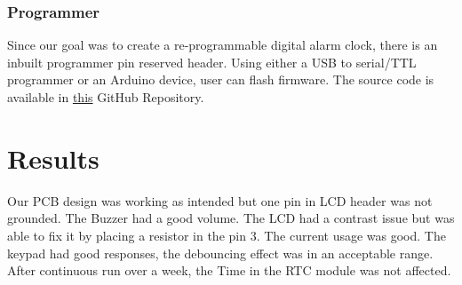 \subsection{Programmer}

Since our goal was to create a re-programmable digital alarm clock, there is an inbuilt programmer pin reserved header. Using either a USB to serial/TTL programmer or an Arduino device, user can flash firmware. The source code is available in \href{https://github.com/dakshinatharindu/Digital-Alarm-Clock}{this} GitHub Repository.

\chapter{Results}
Our PCB design was working as intended but one pin in LCD header was not grounded. The Buzzer had a good volume. The LCD had a contrast issue but was able to fix it by placing a resistor in the pin 3. The current usage was good. The keypad had good responses, the debouncing effect was in an acceptable range. After continuous run over a week, the Time in the RTC module was not affected.

